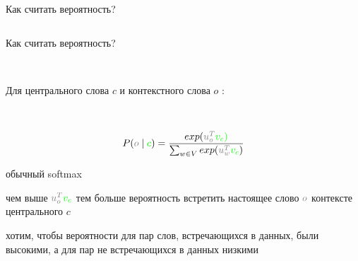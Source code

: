 \documentclass[notes,12pt, aspectratio=169]{beamer}
\newenvironment{wideitemize}{\itemize\addtolength{\itemsep}{10pt}}{\enditemize}
\begin{document}
\begin{frame}{Как считать вероятность?}
\begin{columns}[T]
\begin{column}{.6\textwidth}
\begin{center}
					\end{center}
				\end{column}%
		\end{columns}
\end{frame}


\begin{frame}{Как считать вероятность?} 

	\mbox{  }
	
	Для центрального слова {\color{green} $c$} и контекстного слова  {\color{gray} $o$} :
	
	\mbox{  }

	\[
		P({\color{gray} o} \mid {\color{green} c} ) = \frac{exp({\color{gray} u_o^T}  {\color{green} v_c)}}{\sum_{w \in V}  exp({\color{gray} u^T_w}  {\color{green} v_c} )}
	\] 
	
	\begin{wideitemize} 
		\item  обычный softmax
		\item  чем выше ${\color{gray} u_o^T}  {\color{green} v_c}$ тем больше вероятность встретить настоящее слово  ${\color{gray} o}$ контексте центрального {\color{green} $c$} 
        \item хотим, чтобы вероятности для пар слов, встречающихся в данных, были высокими, а для пар не встречающихся в данных низкими
	\end{wideitemize} 

\end{frame}
\end{document}
